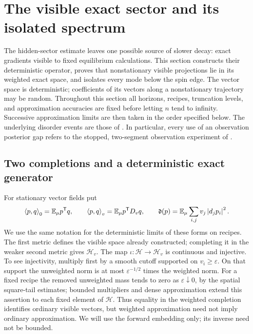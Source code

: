\section{The visible exact sector and its isolated spectrum}
\label{sec:exact}

The hidden-sector estimate leaves one possible source of slower decay:
exact gradients visible to fixed equilibrium calculations.  This section
constructs their deterministic operator, proves that nonstationary visible
projections lie in its weighted exact space, and isolates every mode below
the spin edge.  The vector space is deterministic; coefficients of its
vectors along a nonstationary trajectory may be random.  Throughout this section all horizons,
recipes, truncation levels, and approximation accuracies are fixed before
letting $n$ tend to infinity.  Successive approximation limits are then
taken in the order specified below.  The underlying disorder events are
those of .
In particular, every use of an observation posterior gap refers to the
stopped, two-segment observation experiment of
.

\subsection{Two completions and a deterministic exact generator}

For stationary vector fields put
\begin{equation}\label{eq:exact-metrics}
 \left\langle p,q\right\rangle_0=\mathbb E_\mu p^{\mathsf T}q,
 \qquad
 \left\langle p,q\right\rangle_v=\mathbb E_\mu p^{\mathsf T}D_vq,
 \qquad
 \mathfrak d(p)=\mathbb E_\mu\sum_{i,j}v_j\left\lvert d_jp_i\right\rvert^2.
\end{equation}
We use the same notation for the deterministic limits of these forms on
recipes.  The first metric defines the visible space already constructed;
completing it in the weaker second metric gives $\mathcal H_v$.  The map $\iota:\mathcal H\longrightarrow\mathcal H_v$ is
continuous and injective.  To see injectivity, multiply first by a smooth
cutoff supported on $v_i\ge\varepsilon$.  On that support the unweighted
norm is at most $\varepsilon^{-1/2}$ times the weighted norm.  For a fixed
recipe the removed unweighted mass tends to zero as $\varepsilon\downarrow0$,
by the spatial square-tail estimates; bounded multipliers and dense
approximation extend this assertion to each fixed element of $\mathcal H$.
Thus equality in the weighted completion identifies ordinary visible
vectors, but weighted approximation need not imply ordinary approximation.
We will use the forward embedding only; its inverse need not be bounded.

